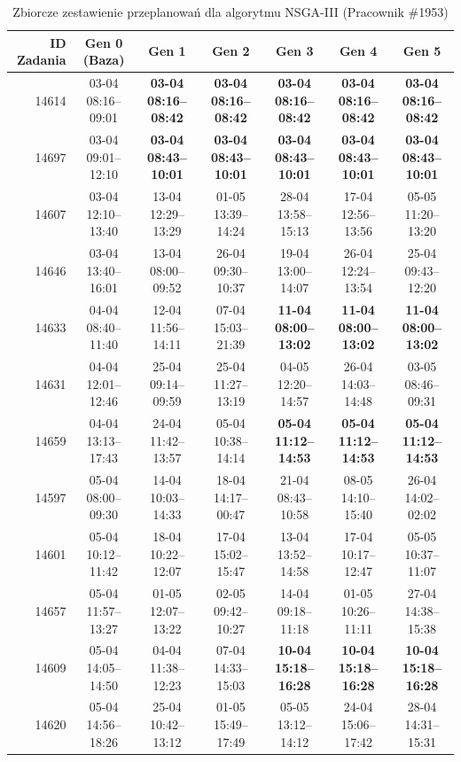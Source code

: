 \begin{table}[htbp]
\centering\scriptsize
\caption{Zbiorcze zestawienie przeplanowań dla algorytmu NSGA-III (Pracownik \#1953)}
\label{tab:case_study_evolution_nsgaiii_u1953}
\begin{tabular}{|r|c|c|c|c|c|c|}
\hline
\textbf{ID Zadania} & \textbf{Gen 0 (Baza)} & \textbf{Gen 1} & \textbf{Gen 2} & \textbf{Gen 3} & \textbf{Gen 4} & \textbf{Gen 5} \\ \hline
14614 & 03-04 08:16--09:01 & \textbf{03-04 08:16--08:42} & \textbf{03-04 08:16--08:42} & \textbf{03-04 08:16--08:42} & \textbf{03-04 08:16--08:42} & \textbf{03-04 08:16--08:42} \\ 
14697 & 03-04 09:01--12:10 & \textbf{03-04 08:43--10:01} & \textbf{03-04 08:43--10:01} & \textbf{03-04 08:43--10:01} & \textbf{03-04 08:43--10:01} & \textbf{03-04 08:43--10:01} \\ 
14607 & 03-04 12:10--13:40 & 13-04 12:29--13:29 & 01-05 13:39--14:24 & 28-04 13:58--15:13 & 17-04 12:56--13:56 & 05-05 11:20--13:20 \\ 
14646 & 03-04 13:40--16:01 & 13-04 08:00--09:52 & 26-04 09:30--10:37 & 19-04 13:00--14:07 & 26-04 12:24--13:54 & 25-04 09:43--12:20 \\ 
14633 & 04-04 08:40--11:40 & 12-04 11:56--14:11 & 07-04 15:03--21:39 & \textbf{11-04 08:00--13:02} & \textbf{11-04 08:00--13:02} & \textbf{11-04 08:00--13:02} \\ 
14631 & 04-04 12:01--12:46 & 25-04 09:14--09:59 & 25-04 11:27--13:19 & 04-05 12:20--14:57 & 26-04 14:03--14:48 & 03-05 08:46--09:31 \\ 
14659 & 04-04 13:13--17:43 & 24-04 11:42--13:57 & 05-04 10:38--14:14 & \textbf{05-04 11:12--14:53} & \textbf{05-04 11:12--14:53} & \textbf{05-04 11:12--14:53} \\ 
14597 & 05-04 08:00--09:30 & 14-04 10:03--14:33 & 18-04 14:17--00:47 & 21-04 08:43--10:58 & 08-05 14:10--15:40 & 26-04 14:02--02:02 \\ 
14601 & 05-04 10:12--11:42 & 18-04 10:22--12:07 & 17-04 15:02--15:47 & 13-04 13:52--14:58 & 17-04 10:17--12:47 & 05-05 10:37--11:07 \\ 
14657 & 05-04 11:57--13:27 & 01-05 12:07--13:22 & 02-05 09:42--10:27 & 14-04 09:18--11:18 & 01-05 10:26--11:11 & 27-04 14:38--15:38 \\ 
14609 & 05-04 14:05--14:50 & 04-04 11:38--12:23 & 07-04 14:33--15:03 & \textbf{10-04 15:18--16:28} & \textbf{10-04 15:18--16:28} & \textbf{10-04 15:18--16:28} \\ 
14620 & 05-04 14:56--18:26 & 25-04 10:42--13:12 & 01-05 15:49--17:49 & 05-05 13:12--14:12 & 24-04 15:06--17:42 & 28-04 14:31--15:31 \\ 

\end{tabular}
\end{table}

